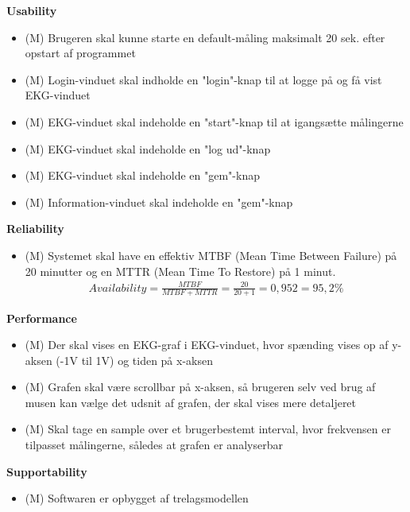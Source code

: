 \textbf{Usability}
\begin{itemize}
	\item (M) Brugeren skal kunne starte en default-måling maksimalt 20 sek. efter opstart af programmet
	\item (M) Login-vinduet skal indholde en "login"\--knap til at logge på og få vist EKG-vinduet
	\item (M) EKG-vinduet skal indeholde en "start"\--knap til at igangsætte målingerne
	\item (M) EKG-vinduet skal indeholde en "log ud"\--knap
	\item (M) EKG-vinduet  skal indeholde en "gem"\--knap
	\item (M) Information-vinduet skal indeholde en "gem"\--knap
\end{itemize}

\textbf{Reliability}
\begin{itemize}
	\item (M) Systemet skal have en effektiv MTBF (Mean Time Between Failure) på 20 minutter og en MTTR (Mean Time To Restore) på 1 minut.
				\begin{align}
					Availability = \frac{MTBF}{MTBF+MTTR} = \frac{20}{20+1} = 0,952 = 95,2 \%
				\end{align}

\end{itemize}

\textbf{Performance}
\begin{itemize}
	\item (M) Der skal vises en EKG-graf i EKG-vinduet, hvor spænding vises op af y-aksen (-1V til 1V) og tiden på x-aksen
	\item (M) Grafen skal være scrollbar på x-aksen, så brugeren selv ved brug af musen kan vælge det udsnit af grafen, der skal vises mere detaljeret
	\item (M) Skal tage en sample over et brugerbestemt interval, hvor frekvensen  er tilpasset målingerne, således at grafen er analyserbar
\end{itemize}

\textbf{Supportability}
\begin{itemize}
	\item (M) Softwaren er opbygget af trelagsmodellen
\end{itemize}















